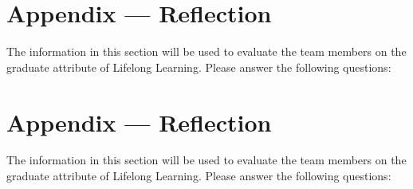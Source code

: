 \documentclass[12pt, titlepage]{article}
\begin{document}
\newpage{}
\section*{Appendix --- Reflection}

The information in this section will be used to evaluate the team members on the
graduate attribute of Lifelong Learning.  Please answer the following questions:

\newpage{}
\section*{Appendix --- Reflection}

The information in this section will be used to evaluate the team members on the
graduate attribute of Lifelong Learning.  Please answer the following questions:
\end{document}
